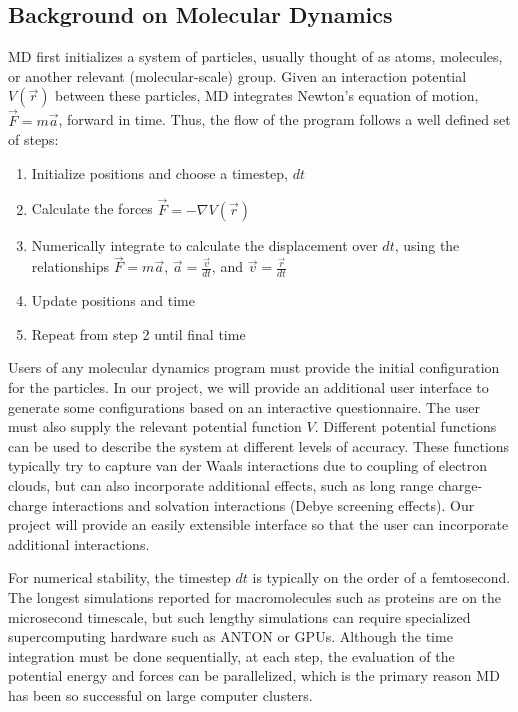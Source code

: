\documentclass[10pt]{article}
\begin{document}
\subsection{Background on Molecular Dynamics}
MD first initializes a system of particles, usually thought of as atoms, molecules, or another relevant (molecular-scale) group.  Given an interaction potential $V (\overrightarrow{r})$ between these particles, MD integrates Newton's equation of motion, $\overrightarrow{F}=m\overrightarrow{a}$, forward in time.  Thus, the flow of the program follows a well defined set of steps:
\begin{enumerate}
    \item Initialize positions and choose a timestep, $dt$
    \item Calculate the forces $\overrightarrow{F} =  -\nabla V (\overrightarrow{r}) $
    \item Numerically integrate to calculate the displacement over $dt$, using the relationships $\overrightarrow{F}=m\overrightarrow{a}$, $\overrightarrow{a} = \frac{\overrightarrow{v}}{dt}$, and $\overrightarrow{v} = \frac{\overrightarrow{r}}{dt}$
    \item Update positions and time
    \item Repeat from step 2 until final time
\end{enumerate}

Users of any molecular dynamics program must provide the initial configuration for the particles.  In our project, we will provide an additional user interface to generate some configurations based on an interactive questionnaire. The user must also supply the relevant potential function $V$. Different potential functions can be used to describe the system at different levels of accuracy. These functions typically try to capture van der Waals interactions due to coupling of electron clouds, but can also incorporate additional effects, such as long range charge-charge interactions and solvation interactions (Debye screening effects). Our project will provide an easily extensible interface so that the user can incorporate additional interactions.

For numerical stability, the timestep $dt$ is typically on the order of a femtosecond. The longest simulations reported for macromolecules such as proteins are on the microsecond timescale, but such lengthy simulations can require specialized supercomputing hardware such as ANTON or GPUs. Although the time integration must be done sequentially, at each step, the evaluation of the potential energy and forces can be parallelized, which is the primary reason MD has been so successful on large computer clusters.
\end{document}
